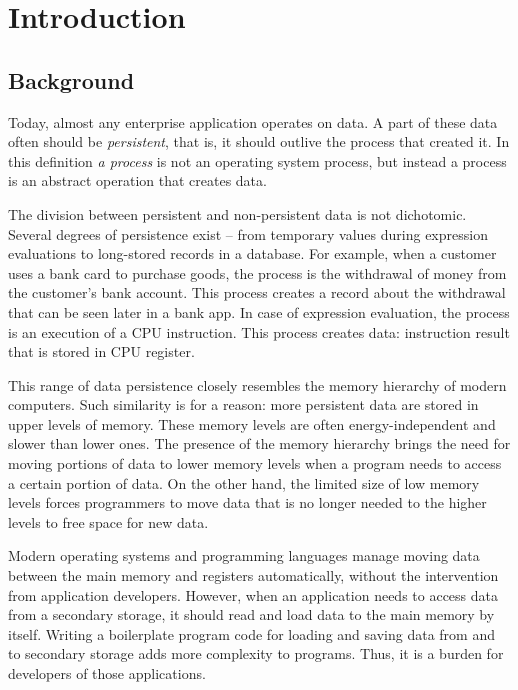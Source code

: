 \chapter{Introduction}

\section{Background}
\label{sec:intro-bg}

Today, almost any enterprise application operates on data. A part of these data
often should be \textit{persistent}, that is, it should outlive the process
that created it. In this definition \textit{a process} is not an operating
system process, but instead a process is an abstract operation that creates
data. 

The division between persistent and non-persistent data is not dichotomic.
Several degrees of persistence exist -- from temporary values during expression
evaluations to long-stored records in a database. For example, when a customer
uses a bank card to purchase goods, the process is the withdrawal of money from
the customer's bank account. This process creates a record about the withdrawal
that can be seen later in a bank app. In case of expression evaluation, the
process is an execution of a CPU instruction. This process creates data:
instruction result that is stored in CPU register.

This range of data persistence closely resembles the memory hierarchy of modern
computers. Such similarity is for a reason: more persistent data are stored in
upper levels of memory. These memory levels are often energy-independent and
slower than lower ones. The presence of the memory hierarchy brings the need
for moving portions of data to lower memory levels when a program needs to
access a certain portion of data. On the other hand, the limited size of low
memory levels forces programmers to move data that is no longer needed to the
higher levels to free space for new data.

Modern operating systems and programming languages manage moving data between
the main memory and registers automatically, without the intervention from
application developers. However, when an application needs to access data from
a secondary storage, it should read and load data to the main memory by itself.
Writing a boilerplate program code for loading and saving data from and to
secondary storage adds more complexity to programs. Thus, it is a burden for
developers of those applications.


